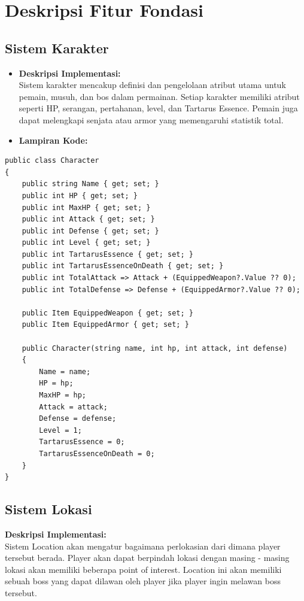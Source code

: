 \documentclass[12pt]{article}
\begin{document}
\section{Deskripsi Fitur Fondasi}
    \subsection{Sistem Karakter}
        \begin{itemize}
            \item \textbf{Deskripsi Implementasi:}  \\
            Sistem karakter mencakup definisi dan pengelolaan atribut utama untuk pemain, musuh, dan bos dalam permainan. Setiap karakter memiliki atribut seperti HP, serangan, pertahanan, level, dan Tartarus Essence. Pemain juga dapat melengkapi senjata atau armor yang memengaruhi statistik total.
            \item \textbf{Lampiran Kode:}
        \end{itemize}
\begin{lstlisting}[language=CSharp, caption=Implementasi Sistem Karakter]
public class Character
{
    public string Name { get; set; }
    public int HP { get; set; }
    public int MaxHP { get; set; }
    public int Attack { get; set; }
    public int Defense { get; set; }
    public int Level { get; set; }
    public int TartarusEssence { get; set; }
    public int TartarusEssenceOnDeath { get; set; }
    public int TotalAttack => Attack + (EquippedWeapon?.Value ?? 0);
    public int TotalDefense => Defense + (EquippedArmor?.Value ?? 0);

    public Item EquippedWeapon { get; set; }
    public Item EquippedArmor { get; set; }

    public Character(string name, int hp, int attack, int defense)
    {
        Name = name;
        HP = hp;
        MaxHP = hp;
        Attack = attack;
        Defense = defense;
        Level = 1;
        TartarusEssence = 0;
        TartarusEssenceOnDeath = 0;
    }
}
\end{lstlisting}

\subsection{Sistem Lokasi}
\textbf{Deskripsi Implementasi:}  \\
Sistem Location akan mengatur bagaimana perlokasian dari dimana player tersebut berada. Player akan dapat berpindah lokasi dengan masing - masing lokasi akan memiliki beberapa point of interest. Location ini akan memiliki sebuah boss yang dapat dilawan oleh player jika player ingin melawan boss tersebut. 
\end{document}
